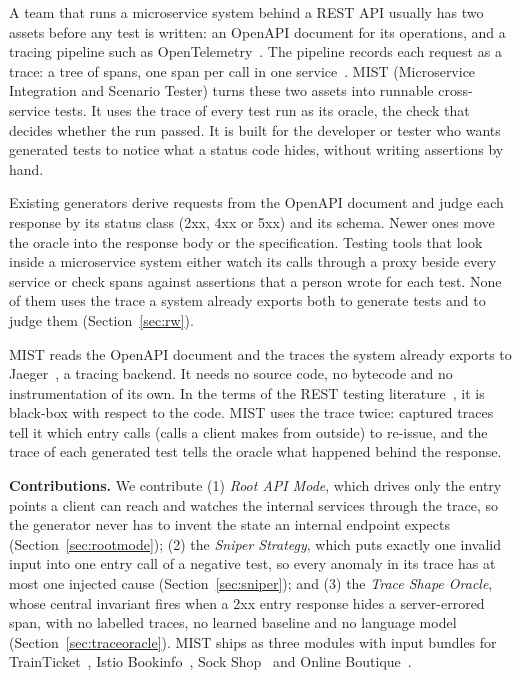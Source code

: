 \documentclass[10pt,conference]{IEEEtran}
\begin{document}
A team that runs a microservice system behind a REST API usually has two assets before any test is written: an OpenAPI document for its operations, and a tracing pipeline such as OpenTelemetry~\cite{OpenTelemetry}. The pipeline records each request as a trace: a tree of spans, one span per call in one service~\cite{Sigelman2010Dapper}. MIST (Microservice Integration and Scenario Tester) turns these two assets into runnable cross-service tests. It uses the trace of every test run as its oracle, the check that decides whether the run passed. It is built for the developer or tester who wants generated tests to notice what a status code hides, without writing assertions by hand.

Existing generators derive requests from the OpenAPI document and judge each response by its status class (2xx, 4xx or 5xx) and its schema. Newer ones move the oracle into the response body or the specification. Testing tools that look inside a microservice system either watch its calls through a proxy beside every service or check spans against assertions that a person wrote for each test. None of them uses the trace a system already exports both to generate tests and to judge them (Section~\ref{sec:rw}).

MIST reads the OpenAPI document and the traces the system already exports to Jaeger~\cite{Jaeger}, a tracing backend. It needs no source code, no bytecode and no instrumentation of its own. In the terms of the REST testing literature~\cite{Golmohammadi2024Survey}, it is black-box with respect to the code. MIST uses the trace twice: captured traces tell it which entry calls (calls a client makes from outside) to re-issue, and the trace of each generated test tells the oracle what happened behind the response.

\textbf{Contributions.} We contribute (1) \emph{Root API Mode}, which drives only the entry points a client can reach and watches the internal services through the trace, so the generator never has to invent the state an internal endpoint expects (Section~\ref{sec:rootmode}); (2) the \emph{Sniper Strategy}, which puts exactly one invalid input into one entry call of a negative test, so every anomaly in its trace has at most one injected cause (Section~\ref{sec:sniper}); and (3) the \emph{Trace Shape Oracle}, whose central invariant fires when a 2xx entry response hides a server-errored span, with no labelled traces, no learned baseline and no language model (Section~\ref{sec:traceoracle}). MIST ships as three modules with input bundles for TrainTicket~\cite{Zhou2018BenchTraintAnalysisSurvey}, Istio Bookinfo~\cite{IstioBookinfo}, Sock Shop~\cite{SockShop} and Online Boutique~\cite{OnlineBoutique}.
\end{document}
